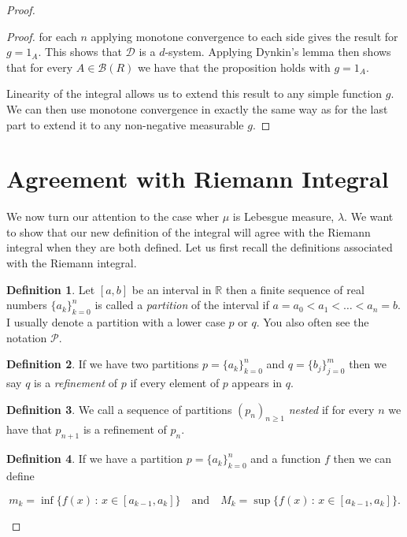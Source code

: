\documentclass[
]{book}
\theoremstyle{definition}
\newtheorem{definition}{Definition}[chapter]
\theoremstyle{definition}
\theoremstyle{definition}
\theoremstyle{definition}
\theoremstyle{remark}
\begin{document}
\begin{proof}
\begin{proof}
for each \(n\) applying monotone convergence to each side gives the result for \(g = 1_A\). This shows that \(\mathcal{D}\) is a \(d\)-system. Applying Dynkin's lemma then shows that for every \(A \in \mathcal{B}(R)\) we have that the proposition holds with \(g=1_A\).

Linearity of the integral allows us to extend this result to any simple function \(g\). We can then use monotone convergence in exactly the same way as for the last part to extend it to any non-negative measurable \(g\).
\end{proof}

\hypertarget{agreement-with-riemann-integral}{%
\section{Agreement with Riemann Integral}\label{agreement-with-riemann-integral}}

We now turn our attention to the case wher \(\mu\) is Lebesgue measure, \(\lambda\). We want to show that our new definition of the integral will agree with the Riemann integral when they are both defined. Let us first recall the definitions associated with the Riemann integral.

\begin{definition}
Let \([a,b]\) be an interval in \(\mathbb{R}\) then a finite sequence of real numbers \(\{a_k\}_{k=0}^n\) is called a \emph{partition} of the interval if \(a=a_0 < a_1 < \dots<a_n=b\). I usually denote a partition with a lower case \(p\) or \(q\). You also often see the notation \(\mathscr{P}\).
\end{definition}

\begin{definition}
If we have two partitions \(p = \{a_k\}_{k=0}^n\) and \(q=\{b_j\}_{j=0}^m\) then we say \(q\) is a \emph{refinement} of \(p\) if every element of \(p\) appears in \(q\).
\end{definition}

\begin{definition}
We call a sequence of partitions \((p_n)_{n \geq 1}\) \emph{nested} if for every \(n\) we have that \(p_{n+1}\) is a refinement of \(p_n\).
\end{definition}

\begin{definition}
If we have a partition \(p = \{a_k\}_{k=0}^n\) and a function \(f\) then we can define

\[ m_k = \inf \{ f(x) \,:\, x \in [a_{k-1},a_k] \} \quad \mbox{and}\quad M_k = \sup\{ f(x)\,:\, x \in [a_{k-1},a_k]\}. \]


\end{definition}
\end{proof}
\end{document}
